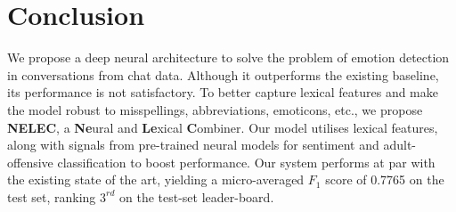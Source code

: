 \documentclass[11pt,a4paper]{article}
\begin{document}
\section{Conclusion}
We propose a deep neural architecture to solve the problem of emotion detection in conversations from chat data. Although it outperforms the existing baseline, its performance is not satisfactory. To better capture lexical features and make the model robust to misspellings, abbreviations, emoticons, etc., we propose \textbf{NELEC}, a \textbf{Ne}ural and \textbf{Le}xical \textbf{C}ombiner. Our model utilises lexical features, along with signals from pre-trained neural models for sentiment and adult-offensive classification to boost performance. Our system performs at par with the existing state of the art, yielding a micro-averaged $F_{1}$ score of 0.7765 on the test set, ranking $3^{rd}$ on the test-set leader-board.



\end{document}
